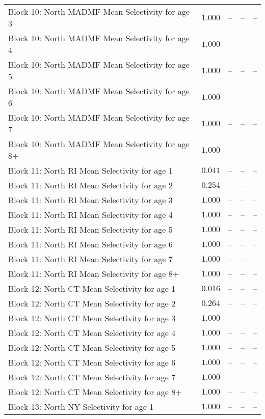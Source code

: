 \documentclass[
]{article}
\begin{document}
\begin{landscape}
\begin{longtable}[t]{lrrrr}
Block 10: North MADMF Mean Selectivity for age 3 & $1.000$ & -- & -- & --\\
Block 10: North MADMF Mean Selectivity for age 4 & $1.000$ & -- & -- & --\\
Block 10: North MADMF Mean Selectivity for age 5 & $1.000$ & -- & -- & --\\
Block 10: North MADMF Mean Selectivity for age 6 & $1.000$ & -- & -- & --\\
\addlinespace
Block 10: North MADMF Mean Selectivity for age 7 & $1.000$ & -- & -- & --\\
Block 10: North MADMF Mean Selectivity for age 8+ & $1.000$ & -- & -- & --\\
Block 11: North RI Mean Selectivity for age 1 & $0.041$ & -- & -- & --\\
Block 11: North RI Mean Selectivity for age 2 & $0.254$ & -- & -- & --\\
Block 11: North RI Mean Selectivity for age 3 & $1.000$ & -- & -- & --\\
\addlinespace
Block 11: North RI Mean Selectivity for age 4 & $1.000$ & -- & -- & --\\
Block 11: North RI Mean Selectivity for age 5 & $1.000$ & -- & -- & --\\
Block 11: North RI Mean Selectivity for age 6 & $1.000$ & -- & -- & --\\
Block 11: North RI Mean Selectivity for age 7 & $1.000$ & -- & -- & --\\
Block 11: North RI Mean Selectivity for age 8+ & $1.000$ & -- & -- & --\\
\addlinespace
Block 12: North CT Mean Selectivity for age 1 & $0.016$ & -- & -- & --\\
Block 12: North CT Mean Selectivity for age 2 & $0.264$ & -- & -- & --\\
Block 12: North CT Mean Selectivity for age 3 & $1.000$ & -- & -- & --\\
Block 12: North CT Mean Selectivity for age 4 & $1.000$ & -- & -- & --\\
Block 12: North CT Mean Selectivity for age 5 & $1.000$ & -- & -- & --\\
\addlinespace
Block 12: North CT Mean Selectivity for age 6 & $1.000$ & -- & -- & --\\
Block 12: North CT Mean Selectivity for age 7 & $1.000$ & -- & -- & --\\
Block 12: North CT Mean Selectivity for age 8+ & $1.000$ & -- & -- & --\\
Block 13: North NY Selectivity for age 1 & $1.000$ & -- & -- & --\\

\end{longtable}
\end{landscape}
\end{document}

